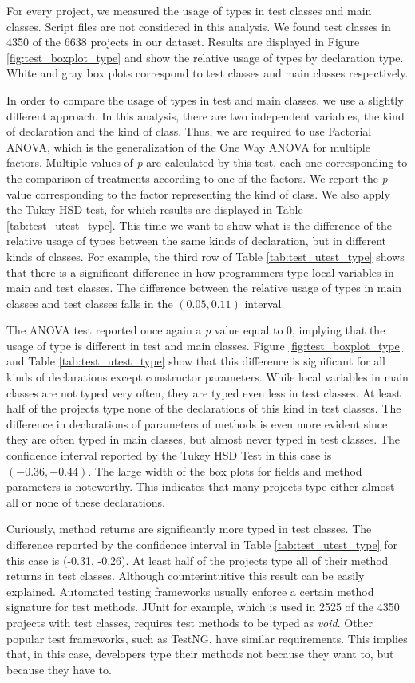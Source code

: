 \documentclass[]{sigplanconf}
\begin{document}
For every project, we measured the usage of types in test classes and main classes.
Script files are not considered in this analysis.
We found test classes in 4350 of the 6638 projects in our dataset.
Results are displayed in Figure \ref{fig:test_boxplot_type} and show the relative usage of types by declaration type.
White and gray box plots correspond to test classes and main classes respectively.

In order to compare the usage of types in test and main classes, we use a slightly different approach.
In this analysis, there are two independent variables, the kind of declaration and the kind of class.
Thus, we are required to use Factorial ANOVA, which is the generalization of the One Way ANOVA for multiple factors.
Multiple values of \emph{p} are calculated by this test, each one corresponding to the comparison of treatments according to one of the factors.
We report the \emph{p} value corresponding to the factor representing the kind of class.
We also apply the Tukey HSD test, for which results are displayed in Table \ref{tab:test_utest_type}.
This time we want to show what is the difference of the relative usage of types between the same kinds of declaration, but in different kinds of classes.
For example, the third row of Table \ref{tab:test_utest_type} shows that there is a significant difference in how programmers type local variables in main and test classes.
The difference between the relative usage of types in main classes and test classes falls in the $(0.05, 0.11)$ interval.

The ANOVA test reported once again a \emph{p} value equal to 0, implying that the usage of type is different in test and main classes.
Figure \ref{fig:test_boxplot_type} and Table \ref{tab:test_utest_type} show that this difference is significant for all kinds of declarations except constructor parameters.
While local variables in main classes are not typed very often, they are typed even less in test classes.
At least half of the projects type none of the declarations of this kind in test classes.
The difference in declarations of parameters of methods is even more evident since they are often typed in main classes, but almost never typed in test classes.
The confidence interval reported by the Tukey HSD Test in this case is $(-0.36, -0.44)$.
The large width of the box plots for fields and method parameters is noteworthy.
This indicates that many projects type either almost all or none of these declarations.

Curiously, method returns are significantly more typed in test classes.
The difference reported by the confidence interval in Table \ref{tab:test_utest_type} for this case is (-0.31, -0.26).
At least half of the projects type all of their method returns in test classes.
Although counterintuitive this result can be easily explained.
Automated testing frameworks usually enforce a certain method signature for test methods.
JUnit for example, which is used in 2525 of the 4350 projects with test classes, requires test methods to be typed as \emph{void}.
Other popular test frameworks, such as TestNG, have similar requirements.
This implies that, in this case, developers type their methods not because they want to, but because they have to.
\end{document}
